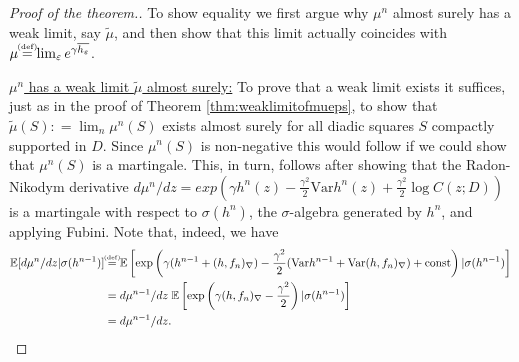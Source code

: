 \documentclass[11pt,reqno]{amsart}
\numberwithin{equation}{section}
\newcommand{\eqbydef}{\mathrel{\stackrel{\hspace*{-3mm}\text{\tiny(def)}\hspace*{-3mm}}{=}}}
\newcommand{\deq}{\mathrel{\mathop:}=}
\newcommand{\eps}{\varepsilon}
\begin{document}
\begin{proof}[Proof of the theorem.]
	To show equality we first argue why $\mu^n$ almost surely has a weak limit, say $\tilde\mu$, and then show that this limit actually coincides with $\mu\eqbydef\lim_\eps e^{\gamma\overline{h_\eps}}$.
	
	\underline{$\mu^n$ has a weak limit $\tilde\mu$ almost surely:} To prove that a weak limit exists it suffices, just as in the proof of Theorem \ref{thm:weaklimitofmueps}, to show that $\tilde\mu(S)\deq\lim_n\mu^n(S)$ exists almost surely for all diadic squares $S$ compactly supported in $D$. Since $\mu^n(S)$ is non-negative this would follow if we could show that $\mu^n(S)$ is a martingale. This, in turn, follows after showing that the Radon-Nikodym derivative $d\mu^n/dz = exp\left(\gamma h^n(z)-\frac{\gamma^2}{2}\text{Var}h^n(z)+\frac{\gamma^2}{2}\log C(z;D)\right)$ is a martingale with respect to $\sigma(h^n)$, the $\sigma$-algebra generated by $h^n$, and applying Fubini.
	Note that, indeed, we have \begin{align*}
		\mathbb E[d\mu^n/dz|\sigma(h^{n-1})]
		&\eqbydef \mathbb E\left[\exp\left(\gamma (h^{n-1}+(h,f_n)_\nabla) - \frac{\gamma^2}{2}(\text{Var}h^{n-1}+\text{Var}(h,f_n)_\nabla) + \text{const}\right)|\sigma(h^{n-1})\right]\\
		&=d\mu^{n-1}/dz\;\mathbb E\left[\exp\left(\gamma(h,f_n)_\nabla - \frac{\gamma^2}{2}\right)|\sigma(h^{n-1})\right]\\
		&=d\mu^{n-1}/dz.
	\end{align*}
	

\end{proof}
\end{document}
